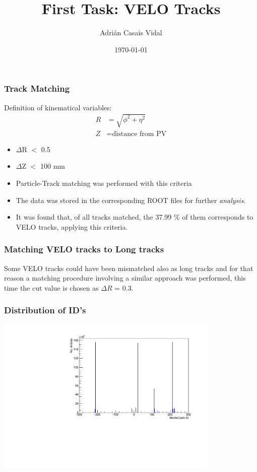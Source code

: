 \documentclass{beamer}
\title{First Task: VELO Tracks}
\author{Adrián Casais Vidal}
\institute[USC]{Universidade de Santiago de Compostela}
\date{\today}
\begin{document}
\begin{frame}
\titlepage
\end{frame}
\begin{frame}
\frametitle{Track Matching}
Definition of kinematical variables:
\begin{align}
R &= \sqrt{\phi^2+\eta^2}\\ 
Z &= \text{distance from PV}
\end{align}
\begin{itemize}
\item $\Delta$R $<$ 0.5 
\item $\Delta$Z $<$ 100 mm
\item Particle-Track matching was performed with this criteria
\item The data was stored in the corresponding ROOT files for further \textit{analysis}.
\item It was found that, of all tracks matched, the 37.99 \% of them corresponds to VELO tracks, applying this criteria.  
\end{itemize}
\end{frame}
\begin{frame}
\frametitle{Matching VELO tracks to Long tracks}

Some VELO tracks could have been mismatched also as long tracks and for that reason a matching procedure involving a similar approach was performed, this time the cut value is chosen as $\Delta R$ = 0.3.  
\end{frame}
\begin{frame}
\frametitle{Distribution of ID's}
\begin{centering}
\includegraphics[width=0.8\textwidth]{MC_ID.pdf}
\end{centering}
\end{frame}
\end{document}
